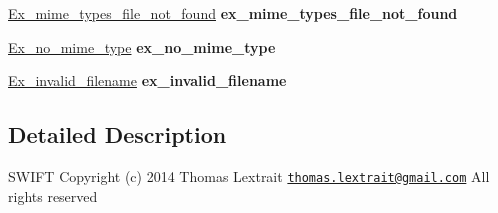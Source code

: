 \begin{DoxyCompactItemize}
\item 
\hypertarget{namespaceswift_a16bf51ecd3b54201ed8c2ee9143d464d}{\hyperlink{classswift_1_1_ex__mime__types__file__not__found}{Ex\-\_\-mime\-\_\-types\-\_\-file\-\_\-not\-\_\-found} {\bfseries ex\-\_\-mime\-\_\-types\-\_\-file\-\_\-not\-\_\-found}}\label{namespaceswift_a16bf51ecd3b54201ed8c2ee9143d464d}

\item 
\hypertarget{namespaceswift_af2db194450bf47f1124a8fe38a0632d2}{\hyperlink{classswift_1_1_ex__no__mime__type}{Ex\-\_\-no\-\_\-mime\-\_\-type} {\bfseries ex\-\_\-no\-\_\-mime\-\_\-type}}\label{namespaceswift_af2db194450bf47f1124a8fe38a0632d2}

\item 
\hypertarget{namespaceswift_a74d05ca82547b1653c17867a639f900d}{\hyperlink{classswift_1_1_ex__invalid__filename}{Ex\-\_\-invalid\-\_\-filename} {\bfseries ex\-\_\-invalid\-\_\-filename}}\label{namespaceswift_a74d05ca82547b1653c17867a639f900d}

\end{DoxyCompactItemize}


\subsection{Detailed Description}
S\-W\-I\-F\-T Copyright (c) 2014 Thomas Lextrait \href{mailto:thomas.lextrait@gmail.com}{\tt thomas.\-lextrait@gmail.\-com} All rights reserved 

